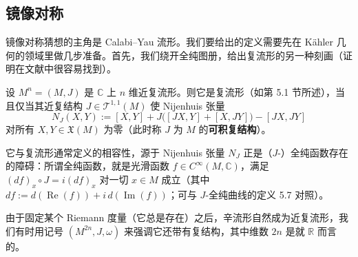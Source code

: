 \subsection{镜像对称}\label{sec:7.2}

镜像对称猜想的主角是 Calabi–Yau 流形。我们要给出的定义需要先在 Kähler 几何的领域里做几步准备。首先，我们绕开全纯图册，给出复流形的另一种刻画（证明在文献中很容易找到）。

\begin{Lem}\label{lem:7.1}
设 $M^n=(M,J)$ 是 $\mathbb C$ 上 $n$ 维近复流形。则它是复流形（如第 5.1 节所述），当且仅当其近复结构 $J\in\mathcal T^{1,1}(M)$ 使 Nijenhuis 张量
\[
N_J(X,Y):=[X,Y]+J\bigl([JX,Y]+[X,JY]\bigr)-[JX,JY]
\]
对所有 $X,Y\in\mathfrak X(M)$ 为零（此时称 $J$ 为 $M$ 的\textbf{可积复结构}）。
\end{Lem}

它与复流形通常定义的相容性，源于 Nijenhuis 张量 $N_J$ 正是（$J$-）全纯函数存在的障碍：所谓全纯函数，就是光滑函数 $f\in C^\infty(M,\mathbb C)$，满足 $(df)_x\circ J=i(df)_x$ 对一切 $x\in M$ 成立（其中 $df:=d(\operatorname{Re}(f))+i\,d(\operatorname{Im}(f))$；可与 $J$-全纯曲线的定义 5.7 对照）。

由于固定某个 Riemann 度量（它总是存在）之后，辛流形自然成为近复流形，我们有时用记号 $(M^{2n},J,\omega)$ 来强调它还带有复结构，其中维数 $2n$ 是就 $\mathbb R$ 而言的。

